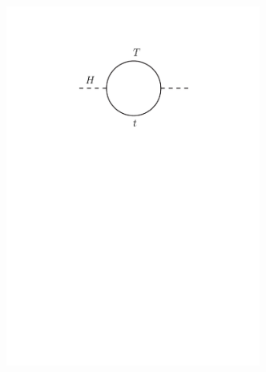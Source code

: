 \begin{figure}[tb]
\begin{center}
\begin{subfigure}{0.32\textwidth}
  	\includegraphics[width=0.92\textwidth]{Theory/FeynmanGraphs/loop_topT_good}
    \caption{} \end{subfigure}
   \begin{subfigure}{0.32\textwidth}

\end{subfigure}
\end{center}
\end{figure}
